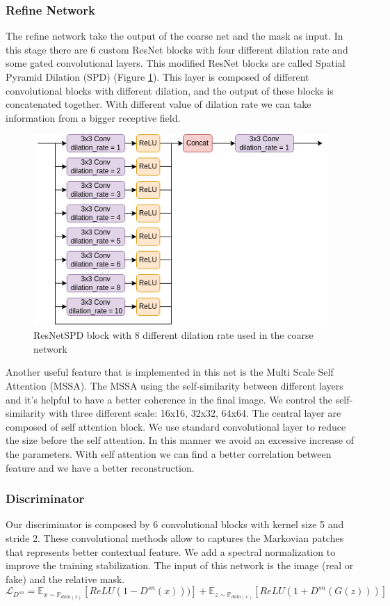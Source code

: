 \documentclass[10pt,twocolumn,letterpaper]{article}
\begin{document}
\subsubsection{Refine Network}
The refine network take the output of the coarse net and the mask as input.
In this stage there are 6 custom ResNet blocks with four different dilation rate and some
gated convolutional layers.
This modified ResNet blocks are called Spatial Pyramid Dilation (SPD) (Figure
\ref{fig:rnspd}). This layer is composed of different convolutional blocks with
different dilation, and the output of these blocks is concatenated together.
With different value of dilation rate we can take information from a bigger
receptive field.
\begin{figure}
  \includegraphics[width=1\linewidth]{img/SPDresnet.png}
  \caption{ResNetSPD block with 8 different dilation rate used in the coarse
  network}
  \label{fig:rnspd}
\end{figure}
Another useful feature that is implemented in this net is the Multi Scale Self
Attention (MSSA). The MSSA using the self-similarity between different layers
and it's helpful to have a better coherence in the final image. We control
the self-similarity with three different scale: 16x16, 32x32, 64x64.
The central layer are composed of self attention block. We use standard
convolutional layer to reduce the size before the self attention. In this manner
we avoid an excessive increase of the parameters. With self attention we can
find a better correlation between feature and we have a better reconstruction.
\subsubsection{Discriminator}
Our discriminator is composed by 6 convolutional blocks with kernel size 5 and
stride 2.
These convolutional methods allow to captures the Markovian patches that
represents better contextual feature\cite{li2016precomputed}.
We add a spectral normalization to improve the training
stabilization\cite{miyato2018spectral}.
The input of this network is the image (real or fake) and the relative mask.
\begin{dmath}
        \mathcal{L}_{D^{sn}}= \mathbb{E}_{x\sim \mathbb{P}_{data(x)}} \left [
          ReLU(1-D^{sn}(x))) \right ] + \mathbb{E}_{z\sim \mathbb{P}_{data(x)}}
        \left [ ReLU(1+D^{sn}(G(z)))\right ]
\end{dmath}
\end{document}
